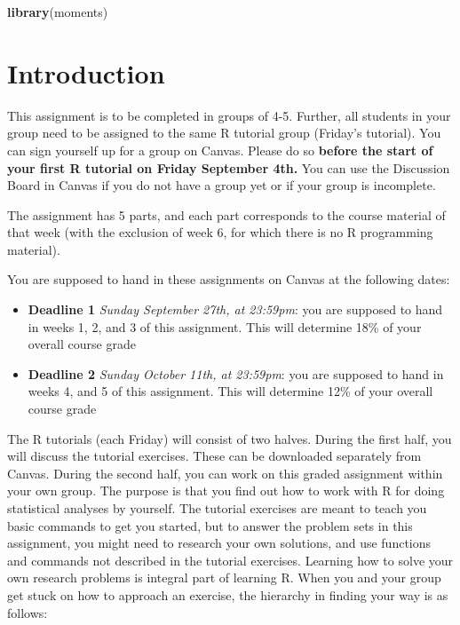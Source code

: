 \documentclass[
]{article}
\newenvironment{Shaded}{\begin{snugshade}}{\end{snugshade}}
\newcommand{\FunctionTok}[1]{\textcolor[rgb]{0.13,0.29,0.53}{\textbf{#1}}}
\newcommand{\NormalTok}[1]{#1}
\providecommand{\tightlist}{%
  \setlength{\itemsep}{0pt}\setlength{\parskip}{0pt}}
\begin{document}
\begin{Shaded}
\begin{Highlighting}[]
\FunctionTok{library}\NormalTok{(moments)}
\end{Highlighting}
\end{Shaded}

\section{Introduction}\label{introduction}

This assignment is to be completed in groups of 4-5. Further, all
students in your group need to be assigned to the same R tutorial group
(Friday's tutorial). You can sign yourself up for a group on Canvas.
Please do so
\textbf{before the start of your first R tutorial on Friday September 4th.}
You can use the Discussion Board in Canvas if you do not have a group
yet or if your group is incomplete.

The assignment has 5 parts, and each part corresponds to the course
material of that week (with the exclusion of week 6, for which there is
no R programming material).

You are supposed to hand in these assignments on Canvas at the following
dates:

\begin{itemize}
\tightlist
\item
  \textbf{Deadline 1} \emph{Sunday September 27th, at 23:59pm}: you are
  supposed to hand in weeks 1, 2, and 3 of this assignment. This will
  determine 18\% of your overall course grade
\item
  \textbf{Deadline 2} \emph{Sunday October 11th, at 23:59pm}: you are
  supposed to hand in weeks 4, and 5 of this assignment. This will
  determine 12\% of your overall course grade
\end{itemize}

The R tutorials (each Friday) will consist of two halves. During the
first half, you will discuss the tutorial exercises. These can be
downloaded separately from Canvas. During the second half, you can work
on this graded assignment within your own group. The purpose is that you
find out how to work with R for doing statistical analyses by yourself.
The tutorial exercises are meant to teach you basic commands to get you
started, but to answer the problem sets in this assignment, you might
need to research your own solutions, and use functions and commands not
described in the tutorial exercises. Learning how to solve your own
research problems is integral part of learning R. When you and your
group get stuck on how to approach an exercise, the hierarchy in finding
your way is as follows:
\end{document}
